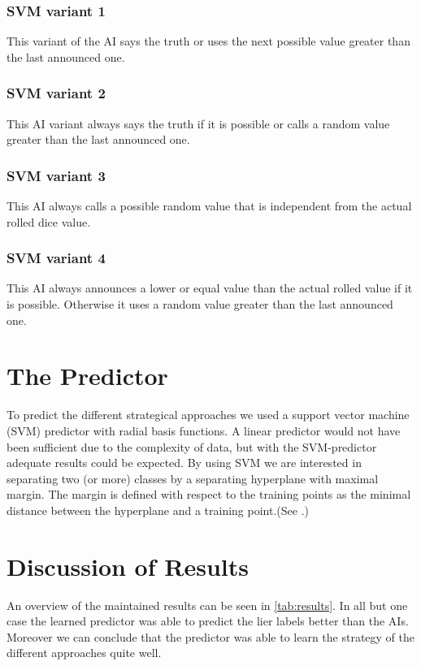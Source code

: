\documentclass[11pt]{article}
\begin{document}
\subsubsection{SVM variant 1}
\label{sssec:svm1}
This variant of the AI says the truth or uses the next possible value greater than the last announced one.

\subsubsection{SVM variant 2}
\label{sssec:svm2}
This AI variant always says the truth if it is possible or calls a random value greater than the last announced one. 

\subsubsection{SVM variant 3}
\label{sssec:svm3}
This AI always calls a possible random value that is independent from the actual rolled dice value.

\subsubsection{SVM variant 4}
\label{sssec:svm4}
This AI always announces a lower or equal value than the actual rolled value if it is possible. Otherwise it uses a random value greater than the last announced one. 

\section{The Predictor}
To predict the different strategical approaches we used a support vector machine (SVM) predictor with radial basis functions. A linear predictor would not have been sufficient due to the complexity of data, but with the SVM-predictor adequate results could be expected.
By using SVM we are interested in separating two (or more) classes by a separating hyperplane with maximal margin. The margin is defined with respect to the training points as the minimal distance between the hyperplane and a training point.(See \cite[187--227]{Schoellkopf:02}.)

\section{Discussion of Results}
An overview of the maintained results can be seen in \cref{tab:results}.
In all but one case the learned predictor was able to predict the lier labels better than the AIs. Moreover we can conclude that the predictor was able to learn the strategy of the different approaches quite well. 
\end{document}
